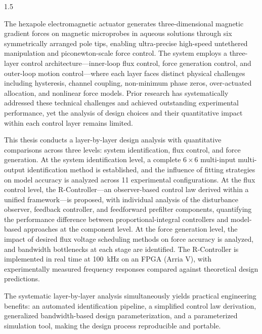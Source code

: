 \begin{abstracten}
\begin{spacing}{1.5}

The hexapole electromagnetic actuator generates three-dimensional magnetic gradient forces on magnetic microprobes in aqueous solutions through six symmetrically arranged pole tips, enabling ultra-precise high-speed untethered manipulation and piconewton-scale force control. The system employs a three-layer control architecture---inner-loop flux control, force generation control, and outer-loop motion control---where each layer faces distinct physical challenges including hysteresis, channel coupling, non-minimum phase zeros, over-actuated allocation, and nonlinear force models. Prior research has systematically addressed these technical challenges and achieved outstanding experimental performance, yet the analysis of design choices and their quantitative impact within each control layer remains limited.

This thesis conducts a layer-by-layer design analysis with quantitative comparisons across three levels: system identification, flux control, and force generation. At the system identification level, a complete $6\times6$ multi-input multi-output identification method is established, and the influence of fitting strategies on model accuracy is analyzed across 11 experimental configurations. At the flux control level, the R-Controller---an observer-based control law derived within a unified framework---is proposed, with individual analysis of the disturbance observer, feedback controller, and feedforward prefilter components, quantifying the performance difference between proportional-integral controllers and model-based approaches at the component level. At the force generation level, the impact of desired flux voltage scheduling methods on force accuracy is analyzed, and bandwidth bottlenecks at each stage are identified. The R-Controller is implemented in real time at 100~kHz on an FPGA (Arria V), with experimentally measured frequency responses compared against theoretical design predictions.

The systematic layer-by-layer analysis simultaneously yields practical engineering benefits: an automated identification pipeline, a simplified control law derivation, generalized bandwidth-based design parameterization, and a parameterized simulation tool, making the design process reproducible and portable.


\end{spacing}
\end{abstracten}
